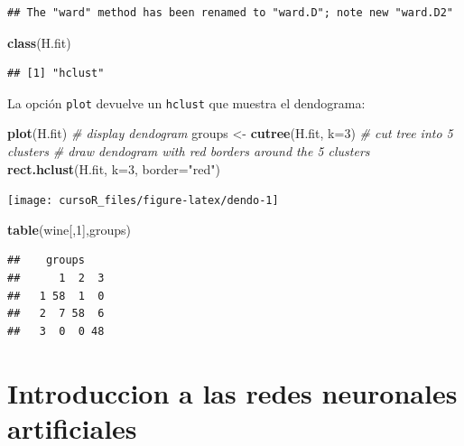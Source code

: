 \documentclass[]{book}
\newenvironment{Shaded}{\begin{snugshade}}{\end{snugshade}}
\newcommand{\KeywordTok}[1]{\textcolor[rgb]{0.13,0.29,0.53}{\textbf{#1}}}
\newcommand{\DataTypeTok}[1]{\textcolor[rgb]{0.13,0.29,0.53}{#1}}
\newcommand{\DecValTok}[1]{\textcolor[rgb]{0.00,0.00,0.81}{#1}}
\newcommand{\StringTok}[1]{\textcolor[rgb]{0.31,0.60,0.02}{#1}}
\newcommand{\CommentTok}[1]{\textcolor[rgb]{0.56,0.35,0.01}{\textit{#1}}}
\newcommand{\NormalTok}[1]{#1}
\begin{document}
\begin{verbatim}
## The "ward" method has been renamed to "ward.D"; note new "ward.D2"
\end{verbatim}

\begin{Shaded}
\begin{Highlighting}[]
\KeywordTok{class}\NormalTok{(H.fit)}
\end{Highlighting}
\end{Shaded}

\begin{verbatim}
## [1] "hclust"
\end{verbatim}

La opción \texttt{plot} devuelve un \texttt{hclust} que muestra el
dendograma:

\begin{Shaded}
\begin{Highlighting}[]
\KeywordTok{plot}\NormalTok{(H.fit) }\CommentTok{# display dendogram}
\NormalTok{groups <-}\StringTok{ }\KeywordTok{cutree}\NormalTok{(H.fit, }\DataTypeTok{k=}\DecValTok{3}\NormalTok{) }\CommentTok{# cut tree into 5 clusters}
\CommentTok{# draw dendogram with red borders around the 5 clusters}
\KeywordTok{rect.hclust}\NormalTok{(H.fit, }\DataTypeTok{k=}\DecValTok{3}\NormalTok{, }\DataTypeTok{border=}\StringTok{"red"}\NormalTok{)}
\end{Highlighting}
\end{Shaded}

\begin{center}\texttt{[image: cursoR\_files/figure-latex/dendo-1]} \end{center}

\begin{Shaded}
\begin{Highlighting}[]
\KeywordTok{table}\NormalTok{(wine[,}\DecValTok{1}\NormalTok{],groups)}
\end{Highlighting}
\end{Shaded}

\begin{verbatim}
##    groups
##      1  2  3
##   1 58  1  0
##   2  7 58  6
##   3  0  0 48
\end{verbatim}

\chapter{Introduccion a las redes neuronales
artificiales}\label{introduccion-a-las-redes-neuronales-artificiales}
\end{document}
